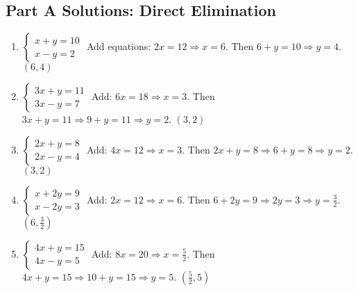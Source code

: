 \documentclass[12pt]{article}
\begin{document}
\subsection*{Part A Solutions: Direct Elimination}
\begin{enumerate}
  \item \(\begin{cases} x + y = 10 \\ x - y = 2 \end{cases}\)  
  Add equations: \(2x = 12 \Rightarrow x = 6\). Then \(6 + y = 10 \Rightarrow y = 4\).  
  \(\boxed{(6, 4)}\)

  \item \(\begin{cases} 3x + y = 11 \\ 3x - y = 7 \end{cases}\)  
  Add: \(6x = 18 \Rightarrow x = 3\). Then \(3x + y = 11 \Rightarrow 9 + y = 11 \Rightarrow y = 2\).  
  \(\boxed{(3, 2)}\)

  \item \(\begin{cases} 2x + y = 8 \\ 2x - y = 4 \end{cases}\)  
  Add: \(4x = 12 \Rightarrow x = 3\). Then \(2x + y = 8 \Rightarrow 6 + y = 8 \Rightarrow y = 2\).  
  \(\boxed{(3, 2)}\)

  \item \(\begin{cases} x + 2y = 9 \\ x - 2y = 3 \end{cases}\)  
  Add: \(2x = 12 \Rightarrow x = 6\). Then \(6 + 2y = 9 \Rightarrow 2y = 3 \Rightarrow y = \tfrac{3}{2}\).  
  \(\boxed{(6, \tfrac{3}{2})}\)

  \item \(\begin{cases} 4x + y = 15 \\ 4x - y = 5 \end{cases}\)  
  Add: \(8x = 20 \Rightarrow x = \tfrac{5}{2}\). Then \(4x + y = 15 \Rightarrow 10 + y = 15 \Rightarrow y = 5\).  
  \(\boxed{(\tfrac{5}{2}, 5)}\)
\end{enumerate}
\end{document}
